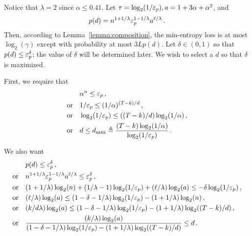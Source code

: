   Notice that $\lambda = 2$ since $\alpha \leq 0.41$.
  Let $\tau = \log_2(1/\mathsf{\varepsilon}_p), a = 1 + 3 \alpha + \alpha^2$,
  and 
  $$
    p(d) = n^{1+1/\lambda} \mathsf{\varepsilon}_p^{1 - 1/\lambda} a^{\ell/\lambda}
    \,.
  $$
  Then, according to Lemma~\ref{lemma:composition}, 
  the min-entropy loss is at most $\log_2(\gamma)$ 
  except with probability at most $3 L p(d)$. 
  Let $\delta \in (0, 1)$ so that $p(d) \leq \mathsf{\varepsilon}_p^\delta$; 
  the value of $\delta$ will be determined later. 
  We wish to select a $d$ so that $\delta$ is maximized.

  First, we require that 
  \begin{align*}
    &\alpha^n \leq \mathsf{\varepsilon}_p\,,\\
    \text{or}\quad &
      1/\mathsf{\varepsilon}_p \leq (1/\alpha)^{(T - k)/d}\,,\\
    \text{or}\quad &
      \log_2(1/\mathsf{\varepsilon}_p) \leq ((T - k)/d)\log_2(1/\alpha)\,,\\
    \text{or}\quad &
      d \leq d_\mathrm{max} \triangleq \frac{(T - k)\log_2(1/\alpha)}{\log_2(1/\mathsf{\varepsilon}_p)}
      \,.
  \end{align*}

  We also want 
  \begin{align*}
    &p(d) \leq \mathsf{\varepsilon}_p^{\delta}\,,\\
    \text{or}\quad &
      n^{1+1/\lambda} \mathsf{\varepsilon}_p^{1 - 1/\lambda} a^{\ell/\lambda} \leq \mathsf{\varepsilon}_p^\delta \,,\\
    \text{or}\quad &
      (1+1/\lambda)\log_2(n)
      + (1/\lambda - 1)\log_2(1/\mathsf{\varepsilon}_p) 
      + (\ell/\lambda) \log_2(a) \leq -\delta \log_2(1/\mathsf{\varepsilon}_p) \,,\\
    \text{or}\quad &      
      (\ell/\lambda) \log_2(a) \leq (1-\delta - 1/\lambda) \log_2(1/\mathsf{\varepsilon}_p) - (1+1/\lambda)\log_2(n)\,,\\
    \text{or}\quad &      
      (k/d\lambda) \log_2(a) \leq (1-\delta - 1/\lambda) \log_2(1/\mathsf{\varepsilon}_p) - (1+1/\lambda)\log_2((T-k)/d)\,,\\
    \text{or}\quad &      
      \frac{(k/\lambda) \log_2(a)}{(1-\delta - 1/\lambda) \log_2(1/\mathsf{\varepsilon}_p) - (1+1/\lambda)\log_2((T-k)/d)} \leq d
      \,.
  \end{align*}
  
